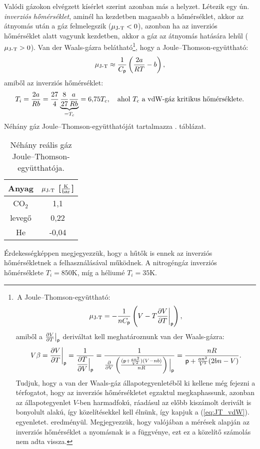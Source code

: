Valódi gázokon elvégzett kísérlet szerint azonban más a helyzet. Létezik egy ún. \emph{inverziós hőmérséklet}, aminél ha kezdetben magasabb a hőmérséklet, akkor az átnyomás után a gáz felmelegszik ($\mu_{\textnormal{J-T}}<0$), azonban ha az inverziós hőmérséklet alatt vagyunk kezdetben, akkor a gáz az átnyomás hatására lehűl ($\mu_{\textnormal{J-T}}>0$).
Van der Waals-gázra belátható\footnote{\,A Joule--Thomson-együttható:
$$\mu_{\textnormal{J-T}} = -\frac{1}{nC_\mathsf p}\left({V-T\frac{\partial{V}}{\partial{T}}\bigg|_\mathsf p}\right),$$
amiből a $\frac{\partial{V}}{\partial{T}}\big|_\mathsf p$ deriváltat kell meghatároznunk van der Waals-gázra:
$$V\beta = \frac{\partial{V}}{\partial{T}}\bigg|_\mathsf p = \frac{1}{\dfrac{\partial T}{\partial V}\Big|_\mathsf p}=\frac{1}{\frac{\partial{}}{\partial{V}}\left({\frac{(\mathsf p+\frac{an^2}{V^2})(V-nb)}{nR}}\right)\Big|_\mathsf p}=\frac{nR}{\mathsf p + \frac{an^2}{V^3}(2bn-V)}.$$ Tudjuk, hogy a van der Waals-gáz állapotegyenletéből ki kellene még fejezni a térfogatot, hogy az inverziós hőmérsékletet egzaktul megkaphassunk, azonban az állapotegyenlet $V$-ben harmadfokú, ráadásul az előbb kiszámolt derivált is bonyolult alakú, így közelítésekkel kell élnünk, így kapjuk a (\ref{eq:JT_vdW}). egyenletet. eredményül. Megjegyezzük, hogy valójában a mérések alapján az inverziós hőmérséklet a nyomásnak is a függvénye, ezt ez a közelítő számolás nem adta vissza.}, hogy a Joule--Thomson-együttható:
\begin{align}\label{eq:JT_vdW}
    \mu_{\textnormal{J-T}} \approx \frac{1}{C_\mathsf p}\left({\frac{2a}{RT}-b}\right),
\end{align}
amiből az inverziós hőmérséklet:
\begin{align}
    T_i=\frac {2a}{Rb} = \frac{27}{4}\underbrace{\frac{8}{27}\frac{a}{Rb}}_{=T_c} = 6{,}75T_c,\quad\textnormal{ahol $T_c$ a vdW-gáz kritikus hőmérséklete.}
\end{align}
Néhány gáz Joule--Thomson-együtthatóját tartalmazza . táblázat.
\begin{table}[h!]
\centering
\begin{tabular}{|c|c|} \hline
Anyag & $\mu_{\textnormal{J-T}}$ [$\frac{\textnormal{K}}{\textnormal{bar}}$] \\ \hline\hline
CO$_2$ & 1{,}1\\ \hline
levegő & 0{,}22\\ \hline
He & -0{,}04\\ \hline
\end{tabular}
\caption{Néhány reális gáz Joule--Thomson-együtthatója.}
\label{tab:JT_coeff}
\end{table}
Érdekességképpen megjegyezzük, hogy a hűtők is ennek az inverziós hőmérsékletnek a felhasználásával működnek. A nitrogéngáz inverziós hőmérséklete $T_i = 850$K, míg a héliumé $T_i = 35$K.
